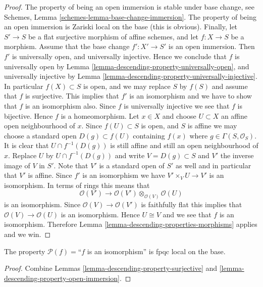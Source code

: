 \begin{proof}
The property of being an open immersion is stable under base change,
see Schemes, Lemma \ref{schemes-lemma-base-change-immersion}.
The property of being an open immersion is Zariski local on the base
(this is obvious).
Finally, let
$S' \to S$ be a flat surjective morphism of affine schemes,
and let $f : X \to S$ be a morphism. Assume that the base change
$f' : X' \to S'$ is an open immersion.
Then $f'$ is universally open, and universally injective.
Hence we conclude that $f$ is universally open by
Lemma \ref{lemma-descending-property-universally-open}, and
universally injective by
Lemma \ref{lemma-descending-property-universally-injective}.
In particular $f(X) \subset S$ is open, and we may replace
$S$ by $f(S)$ and assume that $f$ is surjective.
This implies that $f'$ is an isomorphism and
we have to show that $f$ is an isomorphism also.
Since $f$ is universally injective we see that $f$ is bijective.
Hence $f$ is a homeomorphism.
Let $x \in X$ and choose $U \subset X$ an
affine open neighbourhood of $x$. Since $f(U) \subset S$
is open, and $S$ is affine we may choose a standard open
$D(g) \subset f(U)$ containing $f(x)$ where $g \in \Gamma(S, \mathcal{O}_S)$.
It is clear that $U \cap f^{-1}(D(g))$ is still affine and still an
open neighbourhood of $x$.
Replace $U$ by $U \cap f^{-1}(D(g))$ and write $V = D(g) \subset S$
and $V'$ the inverse image of $V$ in $S'$.
Note that $V'$ is a standard open of $S'$ as well and
in particular that $V'$ is affine.
Since $f'$ is an isomorphism we have $V' \times_V U \to V'$ is
an isomorphism. In terms of rings this means that
$$
\mathcal{O}(V')
\longrightarrow
\mathcal{O}(V') \otimes_{\mathcal{O}(V)} \mathcal{O}(U)
$$
is an isomorphism. Since $\mathcal{O}(V) \to \mathcal{O}(V')$
is faithfully flat this implies that $\mathcal{O}(V) \to \mathcal{O}(U)$
is an isomorphism. Hence $U \cong V$ and we see that $f$ is
an isomorphism.
Therefore Lemma \ref{lemma-descending-properties-morphisms} applies and we win.
\end{proof}

\begin{lemma}
\label{lemma-descending-property-isomorphism}
The property $\mathcal{P}(f) =$``$f$ is an isomorphism''
is fpqc local on the base.
\end{lemma}

\begin{proof}
Combine Lemmas \ref{lemma-descending-property-surjective}
and \ref{lemma-descending-property-open-immersion}.
\end{proof}

